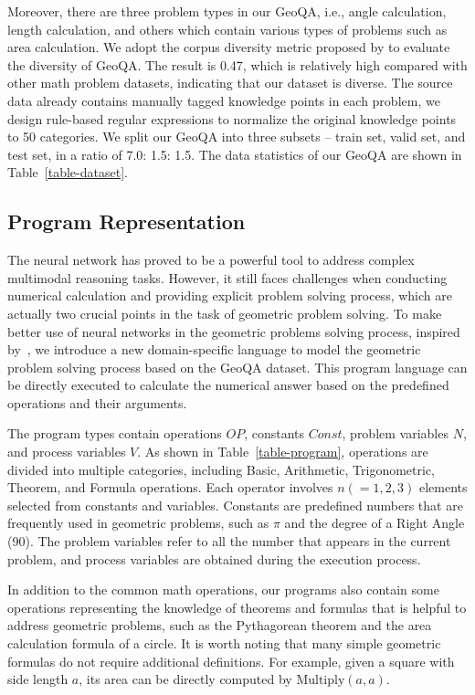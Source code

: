 \documentclass[11pt,a4paper]{article}
\begin{document}
 
Moreover, there are three problem types in our GeoQA, i.e., angle calculation, length calculation, and others which contain various types of problems such as area calculation. 
We adopt the corpus diversity metric proposed by \citet{miao2020diverse} to evaluate the diversity of GeoQA. The result is 0.47, which is relatively high compared with other math problem datasets, indicating that our dataset is diverse. 
The source data already contains manually tagged knowledge points in each problem, we design rule-based regular expressions to normalize the original knowledge points to 50 categories.
We split our GeoQA into three subsets -- train set, valid set, and test set, in a ratio of 7.0: 1.5: 1.5. 
The data statistics of our GeoQA are shown in Table~\ref{table-dataset}.




\subsection{Program Representation}
The neural network has proved to be a powerful tool to address complex multimodal reasoning tasks. However, it still faces challenges when conducting numerical calculation and providing explicit problem solving process, which are actually two crucial points in the task of geometric problem solving. To make better use of neural networks in the geometric problems solving process, inspired by~\citet{amini2019mathqa}, we introduce a new domain-specific language to model the geometric problem solving process based on the GeoQA dataset. This program language can be directly executed to calculate the numerical answer based on the predefined operations and their arguments.

The program types contain operations $OP$, constants $Const$, problem variables $N$, and process variables $V$. As shown in Table~\ref{table-program}, operations are divided into multiple categories, including Basic, Arithmetic, Trigonometric, Theorem, and Formula operations. Each operator involves $n (=1, 2, 3)$ elements selected from constants and variables. Constants are predefined numbers that are frequently used in geometric problems, such as $\pi$ and the degree of a Right Angle (90). The problem variables refer to all the number that appears in the current problem, and process variables are obtained during the execution process.

In addition to the common math operations, our programs also contain some operations representing the knowledge of theorems and formulas that is helpful to address geometric problems, such as the Pythagorean theorem and the area calculation formula of a circle. It is worth noting that many simple geometric formulas do not require additional definitions. For example, given a square with side length $a$, its area can be directly computed by $\text{Multiply}(a,a)$. 
\end{document}
